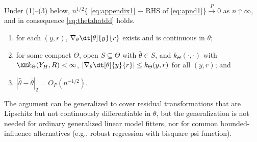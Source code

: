 \begin{prop} \label{prop:thetahatdd} Under (1)--(3) below, $n^{1/2}\{$
  \eqref{eq:appendix1} $-$ RHS of \eqref{eq:apnd1}\}$\stackrel{P}{\rightarrow} 0$ as $n \uparrow
 \infty$, and in consequence \eqref{eq:thetahatdd} holds.
  \begin{enumerate}
  \item for each $(y, r)$, $\nabla_{\theta} \dt[\theta]{y }{
    r}$ exists and is continuous in $\theta$;
  \item for some compact $\Theta$, open $S \subseteq \Theta$ with
    $\bar\theta \in S$, and $k_{\Theta}(\cdot, \cdot)$ with $\EE
    k_{\Theta}({Y_H}, R) < \infty$, $|\nabla_{\theta} \dt[\theta]{y }{ r}| \leq
k_{\Theta}(y, r) $ for all $(y, r)$; and
\item $| \hat\theta - \bar\theta |_{2} = O_{P}(n^{-1/2})$.
  \end{enumerate}

\end{prop}
The argument can be generalized to cover residual transformations that are Lipschitz but not continuously
differentiable in $\theta$, but the generalization is not needed
for ordinary generalized linear model fitters, nor for common
bounded-influence alternatives (e.g., robust regression
with bisquare psi function).







